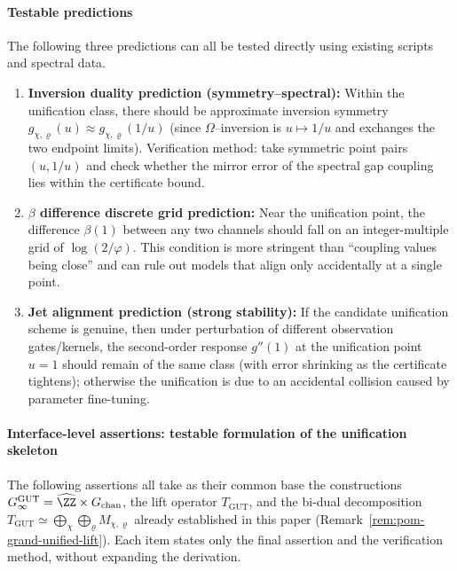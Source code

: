 \paragraph{Testable predictions}
The following three predictions can all be tested directly using existing scripts and spectral data.

\begin{enumerate}
  \item \textbf{Inversion duality prediction (symmetry--spectral):} Within the unification class, there should be approximate inversion symmetry
  \(
  g_{\chi,\varrho}(u)\approx g_{\chi,\varrho}(1/u)
  \)
  (since \(\Omega\)--inversion is \(u\mapsto 1/u\) and exchanges the two endpoint limits). Verification method: take symmetric point pairs \((u,1/u)\) and check whether the mirror error of the spectral gap coupling lies within the certificate bound.

  \item \textbf{\(\beta\) difference discrete grid prediction:} Near the unification point, the difference \(\beta(1)\) between any two channels should fall on an integer-multiple grid of \(\log(2/\varphi)\). This condition is more stringent than ``coupling values being close'' and can rule out models that align only accidentally at a single point.

  \item \textbf{Jet alignment prediction (strong stability):} If the candidate unification scheme is genuine, then under perturbation of different observation gates/kernels, the second-order response \(g''(1)\) at the unification point \(u=1\) should remain of the same class (with error shrinking as the certificate tightens); otherwise the unification is due to an accidental collision caused by parameter fine-tuning.
\end{enumerate}

\paragraph{Interface-level assertions: testable formulation of the unification skeleton}\label{par:gut-seven-additional-results}
The following assertions all take as their common base the constructions \(G_\infty^{\mathrm{GUT}}=\widehat{\ZZ}\times G_{\mathrm{chan}}\), the lift operator \(T_{\mathrm{GUT}}\), and the bi-dual decomposition
\(
T_{\mathrm{GUT}}\simeq\bigoplus_{\chi}\bigoplus_{\varrho}M_{\chi,\varrho}
\)
already established in this paper (Remark~\ref{rem:pom-grand-unified-lift}). Each item states only the final assertion and the verification method, without expanding the derivation.

